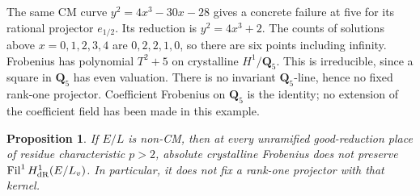 \documentclass[11pt]{article}
\newtheorem{proposition}[theorem]{Proposition}
\theoremstyle{definition}\newtheorem{definition}[theorem]{Definition}
\theoremstyle{remark}\newtheorem{remark}[theorem]{Remark}
\newcommand{\Q}{\mathbf Q}\newcommand{\Z}{\mathbf Z}
\begin{document}
The same CM curve $y^2=4x^3-30x-28$ gives a concrete failure at five for its rational projector $e_{1/2}$. Its reduction is $y^2=4x^3+2$. The counts of solutions above $x=0,1,2,3,4$ are $0,2,2,1,0$, so there are six points including infinity. Frobenius has polynomial $T^2+5$ on crystalline $H^1/\Q_5$. This is irreducible, since a square in $\Q_5$ has even valuation. There is no invariant $\Q_5$-line, hence no fixed rank-one projector. Coefficient Frobenius on $\Q_5$ is the identity; no extension of the coefficient field has been made in this example.

\begin{proposition}\label{prop:one-place-frobenius}
If $E/L$ is non-CM, then at every unramified good-reduction place of residue characteristic $p>2$, absolute crystalline Frobenius does not preserve $\operatorname{Fil}^1H^1_{\mathrm{dR}}(E/L_v)$. In particular, it does not fix a rank-one projector with that kernel.
\end{proposition}
\end{document}

